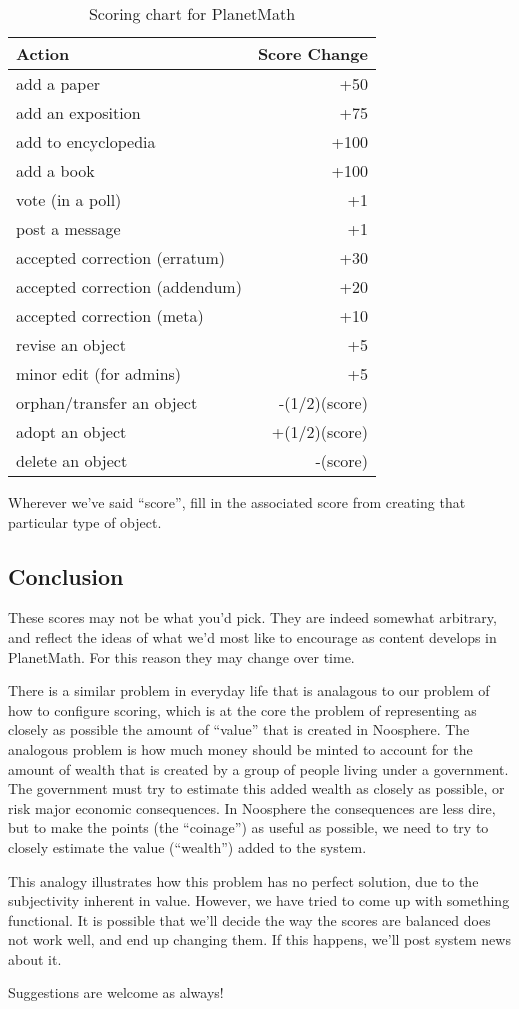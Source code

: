 \begin{table}[h]
\caption{Scoring chart for PlanetMath}\label{tab:scoring}
\begin{center}
\begin{tabular}{|l|r|}
\hline
Action&Score Change\\
\hline
add a paper &+50 \\
\hline
add an exposition &+75 \\
\hline
add to encyclopedia &+100 \\
\hline
add a book &+100 \\
\hline
vote (in a poll) &+1 \\
\hline
post a message &+1 \\
\hline
accepted correction (erratum) &+30 \\
\hline
accepted correction (addendum) &+20 \\
\hline
accepted correction (meta) &+10 \\
\hline
revise an object &+5 \\
\hline
minor edit (for admins) &+5 \\
\hline
orphan/transfer an object &-(1/2)(score) \\
\hline
adopt an object &+(1/2)(score) \\
\hline
delete an object &-(score) \\
\hline
\end{tabular}
\end{center}
\end{table}

Wherever we've said ``score'', fill in the associated score from creating that particular type of object.


\subsection*{Conclusion}

These scores may not be what you'd pick. They are indeed somewhat arbitrary, and reflect the ideas of what we'd most like to encourage as content develops in PlanetMath. For this reason they may change over time.

There is a similar problem in everyday life that is analagous to our problem of how to configure scoring, which is at the core the problem of representing as closely as possible the amount of ``value'' that is created in Noosphere. The analogous problem is how much money should be minted to account for the amount of wealth that is created by a group of people living under a government. The government must try to estimate this added wealth as closely as possible, or risk major economic consequences. In Noosphere the consequences are less dire, but to make the points (the ``coinage'') as useful as possible, we need to try to closely estimate the value (``wealth'') added to the system.

This analogy illustrates how this problem has no perfect solution, due to the subjectivity inherent in value. However, we have tried to come up with something functional. It is possible that we'll decide the way the scores are balanced does not work well, and end up changing them. If this happens, we'll post system news about it.

Suggestions are welcome as always!
